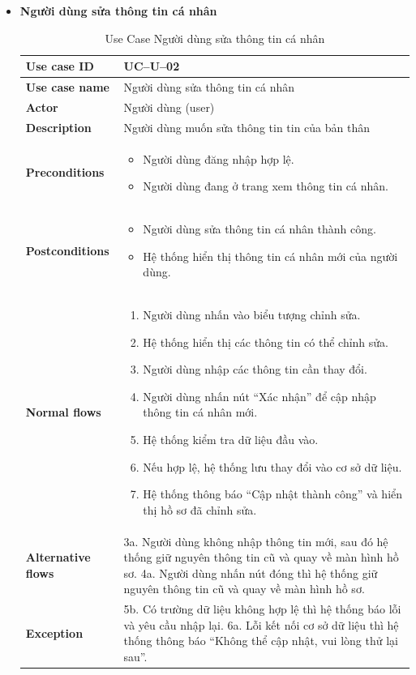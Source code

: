 \begin{itemize}
\item \textbf{Người dùng sửa thông tin cá nhân}
\begin{longtable}{|m{}|m{}|}
          \caption{Use Case Người dùng sửa thông tin cá nhân} \\
  \hline
  \textbf{Use case ID} & UC--U--02 \\
  \hline
  \textbf{Use case name} & Người dùng sửa thông tin cá nhân \\
  \hline
  \textbf{Actor} & Người dùng (user) \\
  \hline
  \textbf{Description} & Người dùng muốn sửa thông tin tin của bản thân \\
  \hline
  \textbf{Preconditions} &
  \begin{itemize}
    \item Người dùng đăng nhập hợp lệ.
    \item Người dùng đang ở trang xem thông tin cá nhân.
  \end{itemize}\\
  \hline
  \textbf{Postconditions} &
  \begin{itemize}
    \item Người dùng sửa thông tin cá nhân thành công.
    \item Hệ thống hiển thị thông tin cá nhân mới của người dùng.
  \end{itemize}\\
  \hline
  \textbf{Normal flows} &
  \begin{enumerate}[label=\arabic*.]
    \item Người dùng nhấn vào biểu tượng chỉnh sửa.
    \item Hệ thống hiển thị các thông tin có thể chỉnh sửa.
    \item Người dùng nhập các thông tin cần thay đổi.
    \item Người dùng nhấn nút “Xác nhận” để cập nhập thông tin cá nhân mới.
    \item Hệ thống kiểm tra dữ liệu đầu vào.
    \item Nếu hợp lệ, hệ thống lưu thay đổi vào cơ sở dữ liệu.
    \item Hệ thống thông báo “Cập nhật thành công” và hiển thị hồ sơ đã chỉnh sửa.
  \end{enumerate}\\
  \hline
  \textbf{Alternative flows} &
  3a. Người dùng không nhập thông tin mới, sau đó hệ thống giữ nguyên thông tin cũ và quay về màn hình hồ sơ. \newline
  4a. Người dùng nhấn nút đóng thì hệ thống giữ nguyên thông tin cũ và quay về màn hình hồ sơ.\\
  \hline
  \textbf{Exception} &
  5b. Có trường dữ liệu không hợp lệ thì hệ thống báo lỗi và yêu cầu nhập lại. \newline
  6a. Lỗi kết nối cơ sở dữ liệu thì hệ thống thông báo “Không thể cập nhật, vui lòng thử lại sau”.\\
  \hline
  \end{longtable}


\end{itemize}
